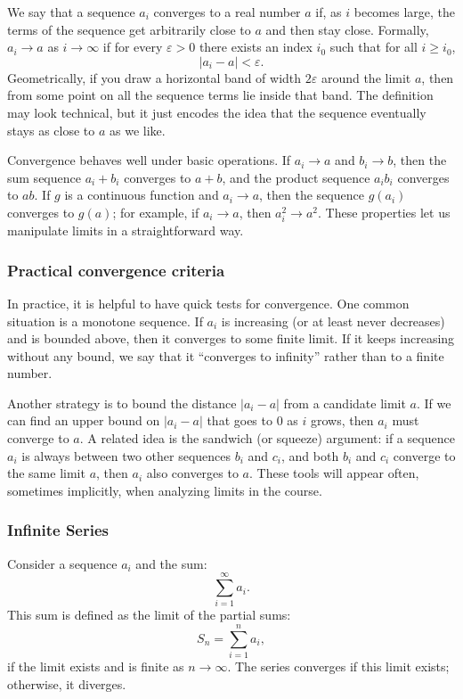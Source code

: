 We say that a sequence \(a_i\) converges to a real number \(a\) if, as \(i\) becomes large, the terms of the sequence get arbitrarily close to \(a\) and then stay close. Formally, \(a_i \to a\) as \(i \to \infty\) if for every \(\varepsilon > 0\) there exists an index \(i_0\) such that for all \(i \ge i_0\),
\[
|a_i - a| < \varepsilon.
\]
Geometrically, if you draw a horizontal band of width \(2\varepsilon\) around the limit \(a\), then from some point on all the sequence terms lie inside that band. The definition may look technical, but it just encodes the idea that the sequence eventually stays as close to \(a\) as we like.

Convergence behaves well under basic operations. If \(a_i \to a\) and \(b_i \to b\), then the sum sequence \(a_i + b_i\) converges to \(a + b\), and the product sequence \(a_i b_i\) converges to \(ab\). If \(g\) is a continuous function and \(a_i \to a\), then the sequence \(g(a_i)\) converges to \(g(a)\); for example, if \(a_i \to a\), then \(a_i^2 \to a^2\). These properties let us manipulate limits in a straightforward way.

\subsubsection{Practical convergence criteria}

In practice, it is helpful to have quick tests for convergence. One common situation is a monotone sequence. If \(a_i\) is increasing (or at least never decreases) and is bounded above, then it converges to some finite limit. If it keeps increasing without any bound, we say that it “converges to infinity” rather than to a finite number.

Another strategy is to bound the distance \(|a_i - a|\) from a candidate limit \(a\). If we can find an upper bound on \(|a_i - a|\) that goes to 0 as \(i\) grows, then \(a_i\) must converge to \(a\). A related idea is the sandwich (or squeeze) argument: if a sequence \(a_i\) is always between two other sequences \(b_i\) and \(c_i\), and both \(b_i\) and \(c_i\) converge to the same limit \(a\), then \(a_i\) also converges to \(a\). These tools will appear often, sometimes implicitly, when analyzing limits in the course.

\subsubsection{Infinite Series}

Consider a sequence \(a_i\) and the sum:
\[
\sum_{i=1}^{\infty} a_i.
\]
This sum is defined as the limit of the partial sums:
\[
S_n = \sum_{i=1}^n a_i,
\]
if the limit exists and is finite as \(n \to \infty\). The series converges if this limit exists; otherwise, it diverges.

